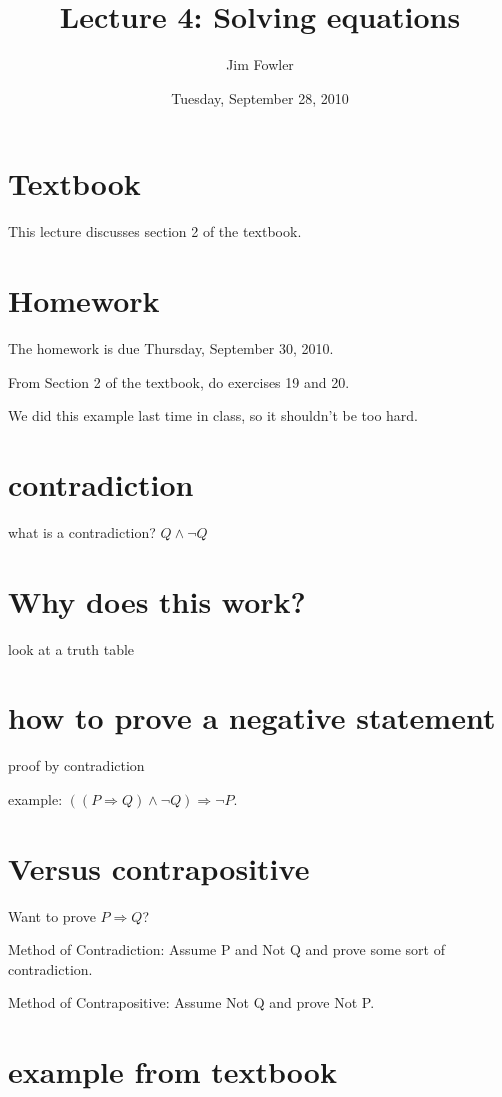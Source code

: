 \documentclass[12pt]{handout}
\title{Lecture 4: Solving equations}
\author{Jim Fowler}
\date{Tuesday, September 28, 2010}
\begin{document}
\maketitle

\section*{Textbook}

This lecture discusses section 2 of the textbook.

\section*{Homework} 

The homework is due Thursday, September 30, 2010.

From Section 2 of the textbook, do exercises 19 and 20.

We did this example last time in class, so it shouldn't be too hard.

\section*{contradiction}

what is a contradiction?  $Q \wedge \neg Q$

\section*{Why does this work?}

look at a truth table

\section*{how to prove a negative statement}

proof by contradiction

example: $((P \Rightarrow Q) \wedge \neg Q) \Rightarrow \neg P$.

\section*{Versus contrapositive}

Want to prove $P \Rightarrow Q$?

Method of Contradiction: Assume P and Not Q and prove some sort of contradiction.

Method of Contrapositive: Assume Not Q and prove Not P.

\section*{example from textbook}
\end{document}
